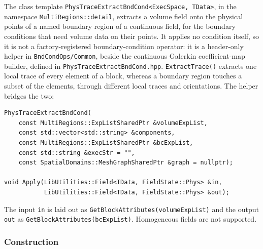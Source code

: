 The class template \texttt{PhysTraceExtractBndCond<ExecSpace, TData>}, in
the namespace \texttt{MultiRegions::detail}, extracts a volume field onto the
physical points of a named boundary region of a continuous field, for the
boundary conditions that need volume data on their points. It applies no
condition itself, so it is not a factory-registered boundary-condition
operator: it is a header-only helper in \texttt{BndCondOps/Common}, beside
the continuous Galerkin coefficient-map builder, defined in
\texttt{PhysTraceExtractBndCond.hpp}.
\texttt{ExtractTrace()} extracts one local trace of every element of a
block, whereas a boundary region touches a subset of the elements, through
different local traces and orientations. The helper bridges the two:
\begin{lstlisting}[style=C++Style]
PhysTraceExtractBndCond(
    const MultiRegions::ExpListSharedPtr &volumeExpList,
    const std::vector<std::string> &components,
    const MultiRegions::ExpListSharedPtr &bcExpList,
    const std::string &execStr = "",
    const SpatialDomains::MeshGraphSharedPtr &graph = nullptr);

void Apply(LibUtilities::Field<TData, FieldState::Phys> &in,
           LibUtilities::Field<TData, FieldState::Phys> &out);
\end{lstlisting}
The input \texttt{in} is laid out as
\texttt{GetBlockAttributes(volumeExpList)} and the output \texttt{out} as
\texttt{GetBlockAttributes(bcExpList)}. Homogeneous fields are not
supported.

\subsubsection*{Construction}

